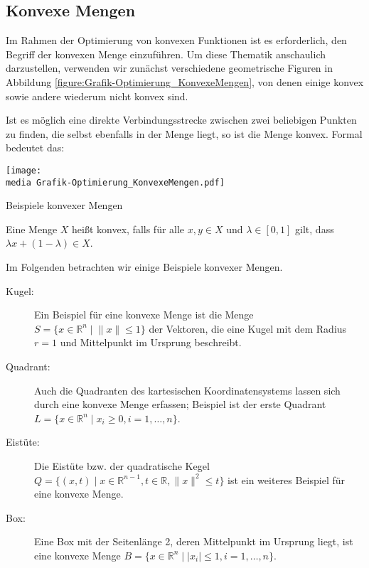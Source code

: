 \subsection{Konvexe Mengen}
Im Rahmen der Optimierung von konvexen Funktionen ist es erforderlich, den Begriff der konvexen Menge einzuführen. Um diese Thematik anschaulich darzustellen, verwenden wir zunächst verschiedene geometrische Figuren in Abbildung \ref{figure:Grafik-Optimierung_KonvexeMengen}, von denen einige konvex sowie andere wiederum nicht konvex sind.

Ist es möglich eine direkte Verbindungsstrecke zwischen zwei beliebigen Punkten zu finden, die selbst ebenfalls in der Menge liegt, so ist die Menge konvex. Formal bedeutet das:

\begin{dsafigure}
\begin{center}
\texttt{[image: \\media Grafik-Optimierung\_KonvexeMengen.pdf]}
\label{figure:Grafik-Optimierung_KonvexeMengen}
\caption{Beispiele konvexer Mengen}
\end{center}
\end{dsafigure}

\begin{Def}
Eine Menge $X$ heißt konvex, falls für alle $x, y \in X$ und $\lambda \in [0,1]$ gilt, dass $\lambda x + (1 - \lambda) \in X$.
\end{Def}

Im Folgenden betrachten wir einige Beispiele konvexer Mengen.
\begin{description}
\item[Kugel:]
Ein Beispiel für eine konvexe Menge ist die Menge $S = \{x \in \mathbb{R}^{n} \mid \lVert x \rVert \le 1\}$ der Vektoren, die eine Kugel mit dem Radius $r = 1$ und Mittelpunkt im Ursprung beschreibt.
\item[Quadrant:] Auch die Quadranten des kartesischen Koordinatensystems lassen sich durch eine konvexe Menge erfassen; Beispiel ist der erste Quadrant $L = \{ x \in \mathbb{R}^{n} \mid x_i \ge 0, i=1,\dots,n\}$.
\item[Eistüte:] Die Eistüte bzw. der quadratische Kegel $Q = \{(x, t) \mid x\in \mathbb{R}^{n-1}, t\in \mathbb{R}, \lVert x\rVert ^{2} \le t\}$ ist ein weiteres Beispiel für eine konvexe Menge.
\item[Box:] Eine Box mit der Seitenlänge 2, deren Mittelpunkt im Ursprung liegt, ist eine konvexe Menge $B = \{x \in \mathbb{R}^{n} \mid |x_{i}| \le 1, i = 1, \dots, n\}$.
\end{description}


